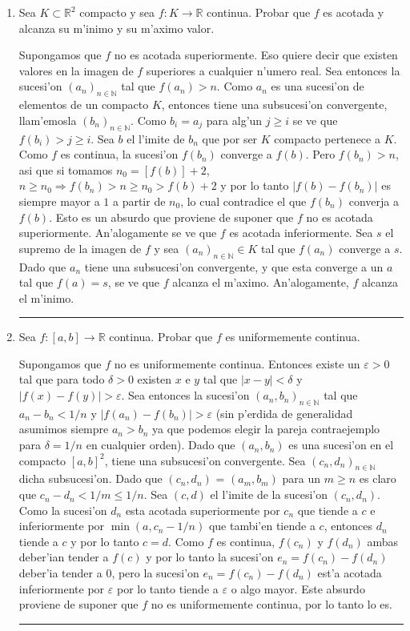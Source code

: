 \documentclass[a4paper,spanish]{article}
\newcommand{\R}[0]{\mathbb{R}}
\newcommand{\N}[0]{\mathbb{N}}
\newcommand{\eps}[0]{\varepsilon}
\newcommand{\lthen}[0]{\Rightarrow}
\newenvironment{demo}{{\noindent \textbf{Demo: }}}{\hfill\rule{2mm}{2mm}\par}
\begin{document}
\begin{enumerate}
\item
Sea $K \subset \R^2$ compacto y sea $f : K \to \R$ continua. Probar que $f$ es
acotada y alcanza su m'inimo y su m'aximo valor.

\begin{demo}
Supongamos que $f$ no es acotada superiormente. Eso quiere decir que existen
valores en la imagen de $f$ superiores a cualquier n'umero real. Sea entonces
la sucesi'on $(a_n)_{n \in \N}$ tal que $f(a_n) > n$. Como $a_n$ es una 
sucesi'on de elementos de un compacto $K$, entonces tiene una subsucesi'on
convergente, llam'emosla $(b_n)_{n \in \N}$. Como $b_i = a_j$ para alg'un
$j \geq i$ se ve que $f(b_i) > j \geq i$. Sea $b$ el l'imite de $b_n$ que
por ser $K$ compacto pertenece a $K$. Como $f$ es continua, la sucesi'on 
$f(b_n)$ converge a $f(b)$. Pero $f(b_n) > n$, asi que si tomamos 
$n_0 = [f(b)] + 2$, $n \geq n_0 \lthen f(b_n) > n \geq n_0 > f(b) + 2$ y por 
lo tanto $|f(b) - f(b_n)|$ es siempre mayor a $1$ a partir de $n_0$, lo cual
contradice el que $f(b_n)$ converja a $f(b)$. Esto es un absurdo que proviene
de suponer que $f$ no es acotada superiormente. An'alogamente se ve que $f$ es
acotada inferiormente. Sea $s$ el supremo de la imagen de $f$ y sea 
$(a_n)_{n \in \N} \in K$ tal que $f(a_n)$ converge a $s$. Dado que $a_n$ tiene
una subsucesi'on convergente, y que esta converge a un $a$ tal que $f(a) = s$,
se ve que $f$ alcanza el m'aximo. An'alogamente, $f$ alcanza el m'inimo.
\end{demo}

\item
Sea $f : [a,b] \to \R$ continua. Probar que $f$ es uniformemente continua.

\begin{demo}
Supongamos que $f$ no es uniformemente continua. Entonces existe un $\eps > 0$
tal que para todo $\delta > 0$ existen $x$ e $y$ tal que $|x-y| < \delta$ y 
$|f(x)-f(y)| > \eps$. Sea entonces la sucesi'on $(a_n,b_n)_{n \in \N}$ tal que
$a_n - b_n < 1/n$ y $|f(a_n)-f(b_n)| > \eps$ (sin p'erdida de generalidad 
asumimos siempre $a_n > b_n$ ya que podemos elegir la pareja contraejemplo para
$\delta = 1/n$ en cualquier orden). Dado que $(a_n,b_n)$ es una sucesi'on en el
compacto $[a,b]^2$, tiene una subsucesi'on convergente. Sea 
$(c_n,d_n)_{n \in \N}$ dicha subsucesi'on. Dado que $(c_n,d_n)$ = $(a_m,b_m)$
para un $m \geq n$ es claro que $c_n - d_n < 1/m \leq 1/n$. Sea $(c,d)$ el 
l'imite de la sucesi'on $(c_n,d_n)$. Como la sucesi'on $d_n$ esta acotada
superiormente por $c_n$ que tiende a $c$ e inferiormente por $\min(a,c_n - 1/n)$
que tambi'en tiende a $c$, entonces $d_n$ tiende a $c$ y por lo tanto $c=d$.
Como $f$ es continua, $f(c_n)$ y $f(d_n)$ ambas deber'ian tender a $f(c)$ y por
lo tanto la sucesi'on $e_n = f(c_n) - f(d_n)$ deber'ia tender a $0$, pero
la sucesi'on $e_n = f(c_n) - f(d_n)$ est'a acotada inferiormente por $\eps$
por lo tanto tiende a $\eps$ o algo mayor. Este absurdo proviene de suponer
que $f$ no es uniformemente continua, por lo tanto lo es.
\end{demo}

\end{enumerate}
\end{document}

